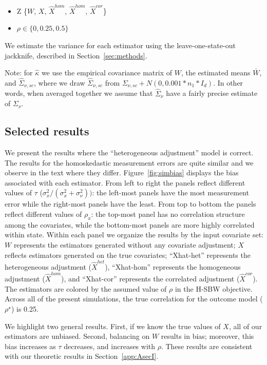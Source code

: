 \begin{itemize}
    \item Z \in \{$W$, $X$, $\hat{X}^{hom}$, $\hat{X}^{hom}$, $\hat{X}^{cor}$\}
    \item $\rho \in \{0, 0.25, 0.5\}$
\end{itemize}

We estimate the variance for each estimator using the leave-one-state-out jackknife, described in Section~\ref{sec:methods}. 

Note: for $\hat{\kappa}$ we use the empirical covariance matrix of $W$, the estimated means $\bar{W}$, and $\hat{\Sigma}_{\nu, sc}$, where we draw $\hat{\Sigma}_{\nu, sc}$ from $\Sigma_{\nu, sc} + N(0, 0.001*n_1*I_d)$. In other words, when averaged together we assume that $\hat{\Sigma}_{\nu}$ have a fairly precise estimate of $\Sigma_{\nu}$.

\subsection{Selected results}\label{ssec:resultsI}

We present the results where the ``heterogeneous adjustment'' model is correct. The results for the homoskedastic measurement errors are quite similar and we observe in the text where they differ. Figure~\ref{fig:simbias} displays the bias associated with each estimator. From left to right the panels reflect different values of $\tau$ ($\sigma^2_x/(\sigma^2_x + \sigma^2_{\nu}))$: the left-most panels have the most measurement error while the right-most panels have the least. From top to bottom the panels reflect different values of $\rho_x$: the top-most panel has no correlation structure among the covariates, while the bottom-most panels are more highly correlated within state. Within each panel we organize the results by the input covariate set: $W$ represents the estimators generated without any covariate adjustment; $X$ reflects estimators generated on the true covariates; ``Xhat-het'' represents the heterogeneous adjustment ($\hat{X}^{het}$), ``Xhat-hom'' represents the homogeneous adjustment ($\hat{X}^{hom}$), and ``Xhat-cor'' represents the correlated adjustment ($\hat{X}^{cor}$). The estimators are colored by the assumed value of $\rho$ in the H-SBW objective. Across all of the present simulations, the true correlation for the outcome model ($\rho^\star$) is 0.25.

We highlight two general results. First, if we know the true values of $X$, all of our estimators are unbiased. Second, balancing on $W$ results in bias; moreover, this bias increases as $\tau$ decreases, and increases with $\rho$.  These results are consistent with our theoretic results in Section~\ref{app:AsecI}.

